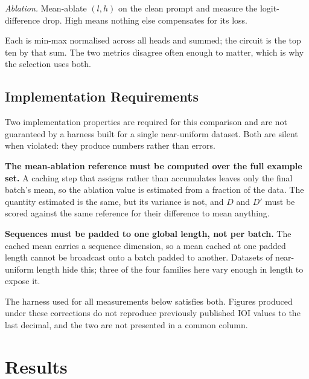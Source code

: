 \documentclass[11pt,a4paper]{article}
\begin{document}
\emph{Ablation.} Mean-ablate $(l,h)$ on the clean prompt and measure the logit-difference
drop. High means nothing else compensates for its loss.

Each is min-max normalised across all heads and summed; the circuit is the top ten by
that sum. The two metrics disagree often enough to matter, which is why the selection
uses both.

\subsection{Implementation Requirements}
\label{sec:defects}

Two implementation properties are required for this comparison and are not guaranteed
by a harness built for a single near-uniform dataset. Both are silent when violated:
they produce numbers rather than errors.

\textbf{The mean-ablation reference must be computed over the full example set.} A
caching step that assigns rather than accumulates leaves only the final batch's mean,
so the ablation value is estimated from a fraction of the data. The quantity estimated
is the same, but its variance is not, and $D$ and $D'$ must be scored against the same
reference for their difference to mean anything.

\textbf{Sequences must be padded to one global length, not per batch.} The cached mean
carries a sequence dimension, so a mean cached at one padded length cannot be broadcast
onto a batch padded to another. Datasets of near-uniform length hide this; three of the
four families here vary enough in length to expose it.

The harness used for all measurements below satisfies both. Figures produced under
these corrections do not reproduce previously published IOI values to the last decimal,
and the two are not presented in a common column.

\section{Results}
\label{sec:results}
\end{document}
